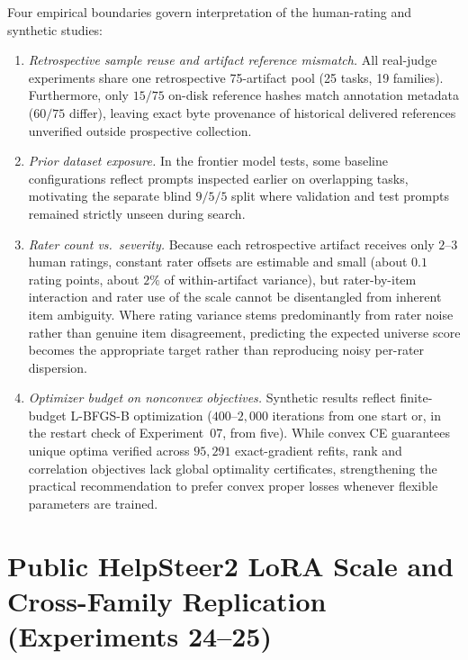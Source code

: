 Four empirical boundaries govern interpretation of the human-rating and synthetic studies:
\begin{enumerate}
    \item \emph{Retrospective sample reuse and artifact reference mismatch.} All real-judge experiments share one retrospective 75-artifact pool (25 tasks, 19 families).
    Furthermore, only $15/75$ on-disk reference hashes match annotation metadata ($60/75$ differ), leaving exact byte provenance of historical delivered references unverified outside prospective collection.
    \item \emph{Prior dataset exposure.} In the frontier model tests, some baseline configurations reflect prompts inspected earlier on overlapping tasks, motivating the separate blind $9/5/5$ split where validation and test prompts remained strictly unseen during search.
    \item \emph{Rater count vs.\ severity.} Because each retrospective artifact receives only $2$--$3$ human ratings, constant rater offsets are estimable and small (about $0.1$ rating points, about $2\%$ of within-artifact variance), but rater-by-item interaction and rater use of the scale cannot be disentangled from inherent item ambiguity.
    Where rating variance stems predominantly from rater noise rather than genuine item disagreement, predicting the expected universe score becomes the appropriate target rather than reproducing noisy per-rater dispersion.
    \item \emph{Optimizer budget on nonconvex objectives.} Synthetic results reflect finite-budget L-BFGS-B optimization ($400$--$2{,}000$ iterations from one start or, in the restart check of Experiment~07, from five).
    While convex CE guarantees unique optima verified across $95{,}291$ exact-gradient refits, rank and correlation objectives lack global optimality certificates, strengthening the practical recommendation to prefer convex proper losses whenever flexible parameters are trained.
\end{enumerate}

\section{Public HelpSteer2 LoRA Scale and Cross-Family Replication (Experiments 24--25)}
\label{sec:supp-helpsteer2}

